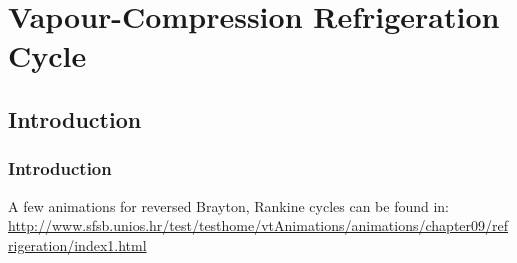 \documentclass[10pt,compress]{beamer}
\begin{document}
\section{Vapour-Compression Refrigeration Cycle}

\subsection{Introduction}

\begin{frame}
 \frametitle{Introduction}

  \scriptsize A few animations for reversed Brayton, Rankine cycles can be found in:
\href{http://www.sfsb.unios.hr/test/testhome/vtAnimations/animations/chapter09/refrigeration/index1.html}{\scriptsize{http://www.sfsb.unios.hr/test/testhome/vtAnimations/animations/chapter09/refrigeration/index1.html}}



\end{frame}
\end{document}
